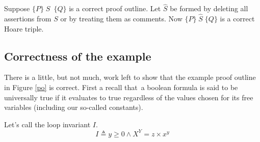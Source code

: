 \documentclass[11pt]{article}%
\begin{document}
Suppose $\{P\}\;S$\ $\{Q\}$ is a correct proof outline. Let $\widehat{S}$ be
formed by deleting all assertions from $S$ or by treating them as comments.
Now $\{P\}\;\widehat{S}\;\{Q\}$ is a correct Hoare triple.

\subsection{Correctness of the example}

There is a little, but not much, work left to show that the example proof
outline in Figure \ref{po} is correct. First a recall that\ a boolean formula
is said to be universally true if it evaluates to true regardless of the
values chosen for its free variables (including our so-called constants).

Let's call the loop invariant $I$.%
\[
I\triangleq y\geq0\wedge X^{Y}=z\times x^{y}%
\]
\end{document}
